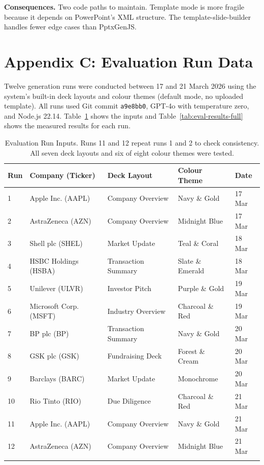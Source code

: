 \textbf{Consequences.} Two code paths to maintain. Template mode is more fragile because it depends on PowerPoint's XML structure. The template-slide-builder handles fewer edge cases than PptxGenJS.

\newpage

\section*{Appendix C: Evaluation Run Data}

Twelve generation runs were conducted between 17 and 21 March 2026 using the system's built-in deck layouts and colour themes (default mode, no uploaded template). All runs used Git commit \texttt{a9e8bb0}, GPT-4o with temperature zero, and Node.js 22.14. Table~\ref{tab:eval-inputs} shows the inputs and Table~\ref{tab:eval-results-full} shows the measured results for each run.

\begin{longtable}{|l|l|l|l|l|}
\hline
\rowcolor{gray!20} \textbf{Run} & \textbf{Company (Ticker)} & \textbf{Deck Layout} & \textbf{Colour Theme} & \textbf{Date} \\
\hline
1 & Apple Inc. (AAPL) & Company Overview & Navy \& Gold & 17 Mar \\
\hline
2 & AstraZeneca (AZN) & Company Overview & Midnight Blue & 17 Mar \\
\hline
3 & Shell plc (SHEL) & Market Update & Teal \& Coral & 18 Mar \\
\hline
4 & HSBC Holdings (HSBA) & Transaction Summary & Slate \& Emerald & 18 Mar \\
\hline
5 & Unilever (ULVR) & Investor Pitch & Purple \& Gold & 19 Mar \\
\hline
6 & Microsoft Corp. (MSFT) & Industry Overview & Charcoal \& Red & 19 Mar \\
\hline
7 & BP plc (BP) & Transaction Summary & Navy \& Gold & 20 Mar \\
\hline
8 & GSK plc (GSK) & Fundraising Deck & Forest \& Cream & 20 Mar \\
\hline
9 & Barclays (BARC) & Market Update & Monochrome & 20 Mar \\
\hline
10 & Rio Tinto (RIO) & Due Diligence & Charcoal \& Red & 21 Mar \\
\hline
11 & Apple Inc. (AAPL) & Company Overview & Navy \& Gold & 21 Mar \\
\hline
12 & AstraZeneca (AZN) & Company Overview & Midnight Blue & 21 Mar \\
\hline
\caption{Evaluation Run Inputs. Runs 11 and 12 repeat runs 1 and 2 to check consistency. All seven deck layouts and six of eight colour themes were tested.}
\label{tab:eval-inputs}
\end{longtable}


